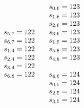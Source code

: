 \documentclass[letterpaper]{article}
\theoremstyle{definition}
\begin{document}
\[\begin{array}[t]{lllll}
\begin{array}{l}
s_{5, 7} = 122 \\
s_{6, 7} = 122 \\
s_{1, 4} = 122 \\
s_{2, 4} = 122 \\
s_{3, 4} = 122 \\
s_{6, 8} = 122 \\
   \end{array}
 &
  \begin{array}{l}
s_{0, 6} = 123 \\
s_{1, 6} = 123 \\
s_{2, 6} = 123 \\
s_{3, 6} = 123 \\
s_{1, 5} = 123 \\
s_{5, 8} = 123 \\
s_{4, 8} = 123 \\
\\
s_{4, 6} = 124 \\
s_{0, 5} = 124 \\
s_{2, 5} = 124 \\
s_{3, 5} = 124 \\
\end{array}
\end{array}
\]
\end{document}
